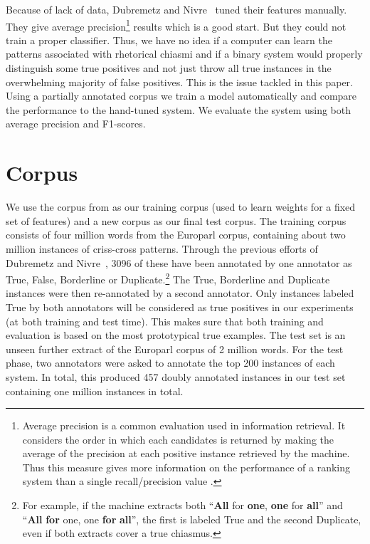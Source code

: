 \documentclass[11pt]{article}
\newcommand{\mn}[1]{\textbf{#1}}
\begin{document}
Because of lack of data, Dubremetz and Nivre~ tuned their features manually. They give average precision\footnote{Average precision is a common evaluation used in information retrieval. It considers the order in which each candidates is returned by making the average of the precision at each positive instance retrieved by the machine. Thus this measure gives more information on the performance of a ranking system than a single recall/precision value \cite{croft2010}.} results which is a good start. But they could not train a proper classifier. Thus, we have no idea if a computer can learn the patterns associated with rhetorical chiasmi and if a binary system would properly distinguish some true positives and not just throw all true instances in the overwhelming majority of false positives. 
This is the issue tackled in this paper. Using a partially annotated corpus we train a model automatically and compare the performance to the hand-tuned system. 
We evaluate the system using both average precision and F1-scores.

\section{Corpus}
We use the corpus from  as our training corpus (used to learn weights for a fixed set of features) and a new corpus as our final test corpus. The training corpus consists of four million words from the Europarl corpus, containing about two million instances of criss-cross patterns. Through the previous efforts of Dubremetz and Nivre~, 3096 of these have been annotated by one annotator as True, False, Borderline or Duplicate.\footnote{For example, if the machine extracts both ``\mn{All} for \mn{one}, \mn{one} for \mn{all}'' and ``\mn{All} \mn{for} one, one \mn{for} \mn{all}'', the first is labeled True and the second Duplicate, even if both extracts cover a true chiasmus.} The True, Borderline and Duplicate instances were then re-annotated by a second annotator. Only instances labeled True by both annotators will be considered as true positives in our experiments (at both training and test time). This makes sure that both training and evaluation is based on the most prototypical true examples. The test set is an unseen further extract of the Europarl corpus of 2 million words. For the test phase, two annotators were asked to annotate the top 200 instances of each system. In total, this produced 457 doubly annotated instances in our test set containing one million instances in total.
\end{document}
